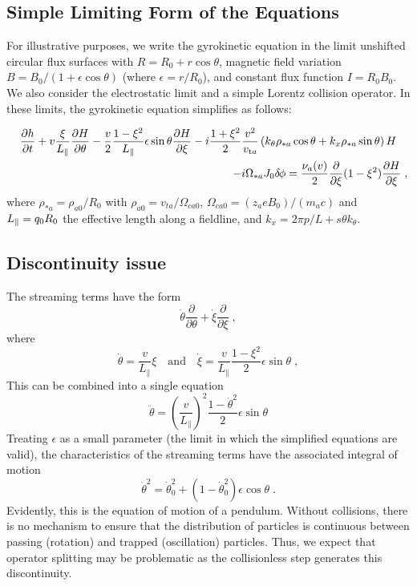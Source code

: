 \documentclass[11pt]{article}
\begin{document}
\subsection{Simple Limiting Form of the Equations}

For illustrative purposes, we write the gyrokinetic equation in the limit 
unshifted circular flux surfaces with $R =  R_0 + r \cos \theta$, magnetic 
field variation $B = B_0 / (1 + \epsilon \cos \theta)$ (where $\epsilon=r/R_0$), 
and constant flux function $I = R_0 B_0$.  We also consider the 
electrostatic limit and a simple Lorentz collision operator.  In 
these limits, the gyrokinetic equation simplifies as follows:

\begin{eqnarray}
& & \frac{\partial h}{\partial t}
%
+ v \frac{\xi}{\lp} \frac{\partial H}{\partial \theta}
%
- \frac{v}{2} \frac{1-\xi^2}{\lp} \epsilon \sin \theta
  \frac{\partial H}{\partial \xi}
%
- i \frac{1 + \xi^2}{2}
\frac{v^2}{\vta}
\left(k_\theta \rho_{*a} \cos \theta + k_x \rho_{*a} \sin \theta \right) H
\quad \nonumber \\ 
& & \quad
%
- i \Omega_{*a} J_0 \dphi
= \frac{\nu_{a}(v)}{2} \frac{\partial}{\partial \xi} 
(1-\xi^2) \frac{\partial H}{\partial \xi} \; ,
\end{eqnarray}
%
where $\rho_{*a} = \rho_{a0} / R_0$ with $\rho_{a0} = v_{ta} / \Omega_{ca0}$,
$\Omega_{ca0} = (z_a e B_0) / (m_a c)$ and $L_\parallel = q_0 R_0$ the 
effective length along a fieldline, and $k_x = 2\pi p/L + s\theta k_\theta$.

\subsection{Discontinuity issue}
The streaming terms have the form
%
\begin{equation}
\dot{\theta} \frac{\partial}{\partial\theta} + 
\dot{\xi} \frac{\partial}{\partial\xi} \; ,
\end{equation}
%
where 
\begin{equation}
\dot{\theta} = \frac{v}{L_\parallel} \xi 
\quad\mathrm{and}\quad
\dot{\xi} = \frac{v}{L_\parallel} \frac{1-\xi^2}{2} \epsilon \sin \theta \; ,
\end{equation}
This can be combined into a single equation 
\begin{equation}
\ddot{\theta} = \left(\frac{v}{L_\parallel}\right)^2 \frac{1-{\dot\theta}^2}{2} 
\epsilon \sin \theta
\end{equation} 
Treating $\epsilon$ as a small parameter (the limit in which the simplified 
equations are valid), the characteristics of the streaming terms have the 
associated integral of motion
\begin{equation}
{\dot\theta}^2 = \dot\theta_0^2 + (1-\dot\theta_0^2) \epsilon\cos\theta \; .
\end{equation}
Evidently, this is the equation of motion of a pendulum.  Without collisions,
there is no mechanism to ensure that the distribution of particles is 
continuous between passing (rotation) and trapped (oscillation) particles.
Thus, we expect that operator splitting may be problematic as the collisionless 
step generates this discontinuity.
\end{document}
